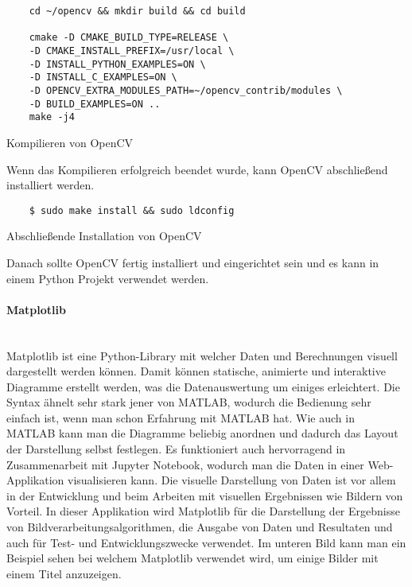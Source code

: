 \begin{listing}[H]
    \begin{verbatim}
    cd ~/opencv && mkdir build && cd build

    cmake -D CMAKE_BUILD_TYPE=RELEASE \
    -D CMAKE_INSTALL_PREFIX=/usr/local \
    -D INSTALL_PYTHON_EXAMPLES=ON \
    -D INSTALL_C_EXAMPLES=ON \
    -D OPENCV_EXTRA_MODULES_PATH=~/opencv_contrib/modules \
    -D BUILD_EXAMPLES=ON ..
    make -j4
    \end{verbatim}
    \caption{Kompilieren von OpenCV}
\end{listing}

Wenn das Kompilieren erfolgreich beendet wurde, kann OpenCV abschließend installiert werden.

\begin{listing}[H]
    \begin{verbatim}
    $ sudo make install && sudo ldconfig
    \end{verbatim}
    \caption{Abschließende Installation von OpenCV}
\end{listing}

Danach sollte OpenCV fertig installiert und eingerichtet sein und es kann in einem Python Projekt verwendet werden.

\paragraph{Matplotlib}\mbox{}\\
Matplotlib ist eine Python-Library mit welcher Daten und Berechnungen visuell dargestellt werden können. Damit können 
statische, animierte und interaktive Diagramme erstellt werden, was die Datenauswertung um einiges erleichtert. 
Die Syntax ähnelt sehr stark jener von MATLAB, wodurch die Bedienung sehr einfach ist, wenn man schon Erfahrung mit 
MATLAB hat. Wie auch in MATLAB kann man die Diagramme beliebig anordnen und dadurch das Layout der Darstellung selbst 
festlegen. Es funktioniert auch hervorragend in Zusammenarbeit mit Jupyter Notebook, wodurch man die Daten in einer 
Web-Applikation visualisieren kann. Die visuelle Darstellung von Daten ist vor allem in der Entwicklung und beim 
Arbeiten mit visuellen Ergebnissen wie Bildern von Vorteil. In dieser Applikation wird Matplotlib für die Darstellung 
der Ergebnisse von Bildverarbeitungsalgorithmen, die Ausgabe von Daten und Resultaten und auch für Test- und 
Entwicklungszwecke verwendet. Im unteren Bild kann man ein Beispiel sehen bei welchem Matplotlib verwendet wird, 
um einige Bilder mit einem Titel anzuzeigen.

